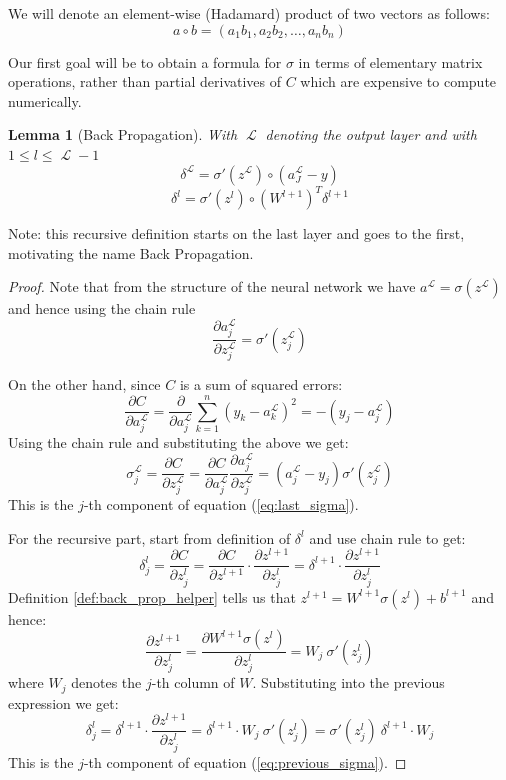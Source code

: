\documentclass[a4paper]{article}
\theoremstyle{break}
\newtheorem{lemma}[theorem]{Lemma}
\newcommand{\Part}[2]{\frac{\partial #1}{\partial #2}}
\DeclareMathOperator{\La}{\mathcal{L}}
\begin{document}
We will denote an element-wise (Hadamard) product of two vectors as follows:
    \newcommand{\hadam}{\circ}
    $$ a \hadam b = (a_1 b_1, a_2 b_2, \ldots, a_n b_n)$$

Our first goal will be to obtain a formula for $\sigma$ in terms of elementary matrix operations, rather than partial derivatives of $C$ which are expensive to compute numerically.

\begin{lemma}[Back Propagation]\label{lem:back_propagation}
With $\La$ denoting the output layer and with $ 1 \leq l \leq \La - 1$ 
\begin{equation}\label{eq:last_sigma}
   \delta^{\La} = \sigma'(z^{\La}) \hadam (a_J^{\La} - y ) 
\end{equation}
\begin{equation}\label{eq:previous_sigma}
    \delta^l = \sigma'(z^l) \hadam (W^{l+1})^T \delta^{l+1}
\end{equation}
\end{lemma}

Note: this recursive definition starts on the last layer and goes to the first, motivating the name Back Propagation.

\begin{proof}
    Note that from the structure of the neural network we have
    $a^{\La} = \sigma(z^{\La})$ and hence using the chain rule
    $$ \Part{a_j^{\La}}{z_j^{\La}} = \sigma' (z_j^{\La}) $$
    
    On the other hand, since $C$ is a sum of squared errors:
    $$ \Part{C}{a_j^{\La}} = \Part{}{a_j^{\La}} \sum_{k=1}^n (y_k - a_k^{\La})^2 = - (y_j - a_j^{\La})$$
    Using the chain rule and substituting the above we get:
    $$ \sigma_j^{\La} = \Part{C}{z_j^{\La}} = \Part{C}{a_j^{\La}} \Part{a_j^{\La}}{z_j^{\La}} = (a_j^{\La} - y_j) \sigma' (z_j^{\La})$$
    This is the $j$-th component of equation (\ref{eq:last_sigma}).
    
    For the recursive part, start from definition of $\delta^l$ and use chain rule to get:
    $$ \delta^l_j = \Part{C}{z_j^l} =
       \Part{C}{z^{l+1}} \cdot \Part{z^{l+1}}{z_j^l} = 
       \delta^{l+1}      \cdot \Part{z^{l+1}}{z_j^l} $$
    Definition \ref{def:back_prop_helper} tells us that
    $ z^{l+1} = W^{l+1} \sigma(z^{l}) + b^{l+1} $
    and hence:
    $$  \Part{z^{l+1}}{z^l_j} =
        \Part{W^{l+1} \sigma(z^l)}{z_j^l} = W_{j} ~ \sigma'(z_j^l)$$
    where $W_{j}$ denotes the $j$-th column of $W$. Substituting into the previous expression we get:
    $$ \delta^l_j = \delta^{l+1} \cdot \Part{z^{l+1}}{z_j^l}
     = \delta^{l+1} \cdot W_{j} ~ \sigma'(z_j^l) = \sigma'(z_j^l) ~ \delta^{l+1} \cdot W_{j}$$
    This is the $j$-th component of equation (\ref{eq:previous_sigma}).
\end{proof}
\end{document}
